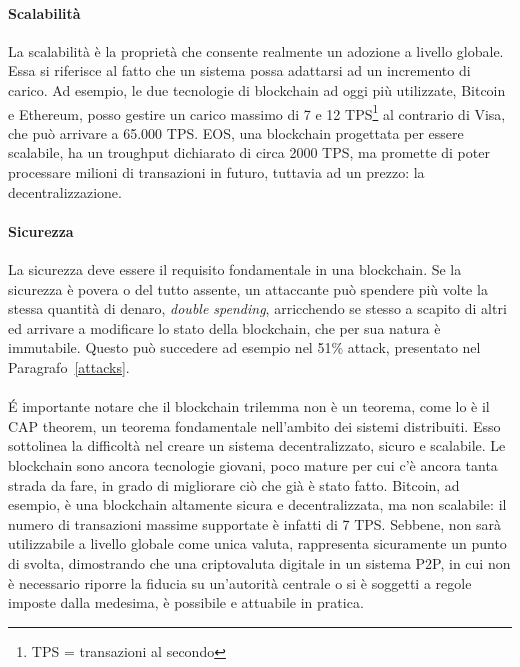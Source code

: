 \paragraph{Scalabilità}
La scalabilità è la proprietà che consente realmente un adozione a livello globale. Essa si riferisce al fatto che un sistema possa adattarsi ad un incremento di carico. Ad esempio, le due tecnologie di blockchain ad oggi più utilizzate, Bitcoin e Ethereum, posso gestire un carico massimo di 7 e 12 TPS\footnote{TPS = transazioni al secondo}
al contrario di Visa, che può arrivare a 65.000 TPS. EOS, una blockchain progettata per essere scalabile, ha un troughput dichiarato di circa 2000 TPS, ma promette di poter processare milioni di transazioni in futuro, tuttavia ad un prezzo: la decentralizzazione.

\paragraph{Sicurezza}
La sicurezza deve essere il requisito fondamentale in una blockchain. Se la sicurezza è povera o del tutto assente, un attaccante può spendere più volte la stessa quantità di denaro, \emph{double spending}, arricchendo se stesso a scapito di altri ed arrivare a modificare lo stato della blockchain, che per sua natura è immutabile. Questo può succedere ad esempio nel 51\% attack, presentato nel Paragrafo~\ref{attacks}.

\paragraph*{}
\'E importante notare che il blockchain trilemma non è un teorema, come lo è il CAP theorem, un teorema fondamentale nell'ambito dei sistemi distribuiti. Esso sottolinea la difficoltà nel creare un sistema decentralizzato, sicuro e scalabile. Le blockchain sono ancora tecnologie giovani, poco mature per cui c'è ancora tanta strada da fare, in grado di migliorare ciò che già è stato fatto. Bitcoin, ad esempio, è una blockchain altamente sicura e decentralizzata, ma non scalabile: il numero di transazioni massime supportate è infatti di 7 TPS. Sebbene, non sarà utilizzabile a livello globale come unica valuta, rappresenta sicuramente un punto di svolta, dimostrando che una criptovaluta digitale in un sistema P2P, in cui non è necessario riporre la fiducia su un'autorità centrale o si è soggetti a regole imposte dalla medesima, è possibile e attuabile in pratica.


